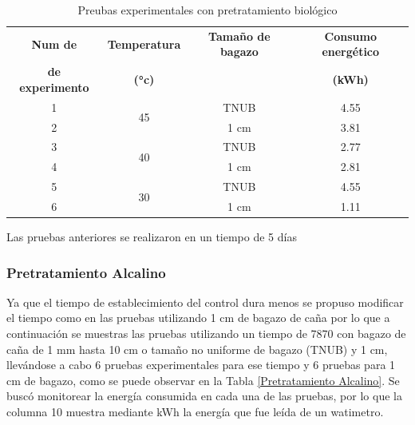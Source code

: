 \documentclass[12pt]{article}
\begin{document}
	\begin{table}[H]
		\centering
		\caption{Preubas experimentales con pretratamiento biológico}
		\begin{tabular}{|c|c|c|c|}
			\hline
			\textbf{Num de} &\textbf{ Temperatura} & \textbf{Tamaño de bagazo} & \textbf{Consumo energético } \\ 
			\textbf{de experimento} &\textbf{  (°c)} &  & \textbf{ (kWh)} \\ \hline
			1 & \multirow{2}{*}{45} & TNUB & 4.55 \\ \cline{1-1} \cline{3-4}
			2 &  & 1 cm & 3.81 \\ \hline
			3 &\multirow{2}{*}{ 40} & TNUB & 2.77 \\ \cline{3-4} \cline{1-1}
			4 &  & 1 cm & 2.81 \\ \hline
			5 &\multirow{2}{*}{ 30} & TNUB & 4.55 \\ \cline{3-4}\cline{1-1}
			6 &  & 1 cm & 1.11 \\ \hline
		\end{tabular}
		\label{Pretratamiento Biológico}
	\end{table}
	
	Las pruebas anteriores se realizaron en un tiempo de 5 días
		
		\subsubsection{Pretratamiento Alcalino}
		
		
		Ya que el tiempo de establecimiento del control dura menos se propuso modificar el tiempo como en las pruebas utilizando 1 cm de bagazo de caña por lo que a continuación se muestras las pruebas utilizando un tiempo de 7870 con bagazo de caña de 1 mm hasta 10 cm o tamaño no uniforme de bagazo (TNUB) y 1 cm, llevándose a cabo 6 pruebas experimentales para ese tiempo y 6 pruebas para 1 cm de bagazo, como se puede observar en la Tabla \ref{Pretratamiento Alcalino}. 
		Se buscó monitorear la energía consumida en cada una de las pruebas, por lo que la columna 10 muestra mediante kWh la energía que fue leída de un watimetro.
		
\end{document}
